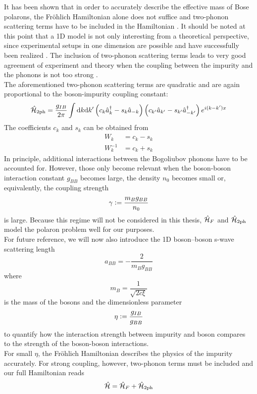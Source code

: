 It has been shown that in order to accurately describe the effective mass of Bose polarons, the Fröhlich Hamiltonian alone does not suffice and two-phonon scattering terms have to be included in the Hamiltonian \cite{Grusdt_2017}. It should be noted at this point that a 1D model is not only interesting from a theoretical perspective, since experimental setups in one dimension are possible and have successfully been realized \cite{Catani}. The inclusion of two-phonon scattering terms leads to very good agreement of experiment and theory when the coupling between the impurity and the phonons is not too strong \cite{Grusdt_2017}. \\
The aforementioned two-phonon scattering terms are quadratic and are again proportional to the boson-impurity coupling constant:
\begin{equation}
\hat{\mathcal{H}}_{2\mathrm{ph}}=\frac{g_{IB}}{2\pi}\int\mathrm d k\mathrm d k^\prime \left(c_k\hat a^\dagger_k-s_k\hat a_{-k}\right)\left(c_{k^\prime}\hat a_{k^\prime}-s_{k^\prime}\hat a^\dagger_{-k^\prime}\right)e^{i(k-k^\prime)x}
\end{equation}
The coefficients $c_k$ and $s_k$ can be obtained from 
\begin{subequations}
\begin{align}
W_k &= c_k - s_k\\
W_k^{-1} &= c_k + s_k
\end{align}
\end{subequations}
In principle, additional interactions between the Bogoliubov phonons have to be accounted for. However, those only become relevant when the boson-boson interaction constant $g_{BB}$ becomes large, the density $n_0$ becomes small or, equivalently, the coupling strength \begin{equation}\gamma\vcentcolon=\frac{m_B g_{BB}}{n_0}\end{equation} is large. Because this regime will not be considered in this thesis, $\hat{\mathcal{H}}_F$ and $\hat{\mathcal{H}}_{2\mathrm{ph}}$ model the polaron problem well for our purposes.\\
For future reference, we will now also introduce the 1D boson–boson s-wave scattering length 
\begin{equation}
a_{BB}=-\frac{2}{m_Bg_{BB}}
\end{equation}
where \begin{equation}m_B = \frac{1}{\sqrt{2c\xi}}\end{equation} is the mass of the bosons
and the dimensionless parameter 
\begin{equation}
\eta\vcentcolon= \frac{g_{IB}}{g_{BB}}
\end{equation}
to quantify how the interaction strength between impurity and boson compares to the strength of the boson-boson interactions.\\
For small $\eta$, the Fröhlich Hamiltonian describes the physics of the impurity accurately. For strong coupling, however, two-phonon terms must be included and our full Hamiltonian reads
\begin{equation}\label{full_ham}
\hat{\mathcal{H}} = \hat{\mathcal{H}}_F + \hat{\mathcal{H}}_{2\mathrm{ph}}
\end{equation}

